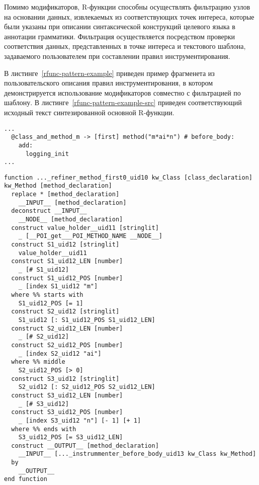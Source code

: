 Помимо модификаторов, R-функции способны осуществлять фильтрацию узлов на основании данных, извлекаемых из соответствующих точек интереса, которые были указаны при описании синтаксической конструкций целевого языка в аннотации грамматики.
Фильтрация осуществляется посредством проверки соответствия данных, представленных в точке интереса и текстового шаблона, задаваемого пользователем при составлении правил инструментирования.

В листинге~\ref{rfunc-pattern-example} приведен пример фрагменета из пользовательского описания правил инструментирования, в котором демонстрируется использование модификаторов совместно с фильтрацией по шаблону.
В листинге~\ref{rfunc-pattern-example-src} приведен соответствующий исходный текст синтезированной основной R-функции.

\begin{lstlisting}[frame=single, label={rfunc-pattern-example}, caption={Пример использования текстового шаблона.}]
...
  @class_and_method_m -> [first] method("m*ai*n") # before_body:
    add:
      logging_init
...
\end{lstlisting}

\begin{lstlisting}[frame=single, language=TXL, label={rfunc-pattern-example-src}, caption={Пример синтезированной R-функции со встроенной проверкой на соответствие шаблону.}]
function ..._refiner_method_first0_uid10 kw_Class [class_declaration] kw_Method [method_declaration]
  replace * [method_declaration]
    __INPUT__ [method_declaration]
  deconstruct __INPUT__
    __NODE__ [method_declaration]
  construct value_holder__uid11 [stringlit]
    _ [__POI_get___POI_METHOD_NAME __NODE__]
  construct S1_uid12 [stringlit]
    value_holder__uid11
  construct S1_uid12_LEN [number]
    _ [# S1_uid12]
  construct S1_uid12_POS [number]
    _ [index S1_uid12 "m"] 
  where %% starts with
    S1_uid12_POS [= 1]
  construct S2_uid12 [stringlit]
    S1_uid12 [: S1_uid12_POS S1_uid12_LEN]
  construct S2_uid12_LEN [number]
    _ [# S2_uid12]
  construct S2_uid12_POS [number]
    _ [index S2_uid12 "ai"] 
  where %% middle
    S2_uid12_POS [> 0]
  construct S3_uid12 [stringlit]
    S2_uid12 [: S2_uid12_POS S2_uid12_LEN]
  construct S3_uid12_LEN [number]
    _ [# S3_uid12]
  construct S3_uid12_POS [number]
    _ [index S3_uid12 "n"] [- 1] [+ 1]
  where %% ends with
    S3_uid12_POS [= S3_uid12_LEN]
  construct __OUTPUT__ [method_declaration]
    __INPUT__ [..._instrummenter_before_body_uid13 kw_Class kw_Method]
  by
    __OUTPUT__
end function
\end{lstlisting}

